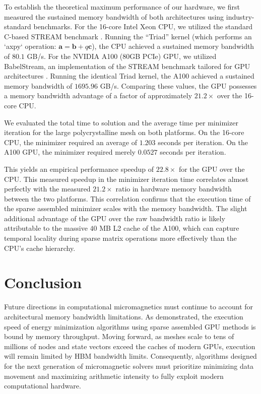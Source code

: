 \documentclass[10pt, a4paper, twocolumn]{article}
\begin{document}
To establish the theoretical maximum performance of our hardware, we first measured the sustained memory bandwidth of both architectures using industry-standard benchmarks. For the 16-core Intel Xeon CPU, we utilized the standard C-based STREAM benchmark \cite{McCalpin1995}. Running the ``Triad'' kernel (which performs an `axpy` operation: $\mathbf{a} = \mathbf{b} + q \mathbf{c}$), the CPU achieved a sustained memory bandwidth of $80.1$ GB/s. For the NVIDIA A100 (80GB PCIe) GPU, we utilized BabelStream, an implementation of the STREAM benchmark tailored for GPU architectures \cite{Deakin2018}. Running the identical Triad kernel, the A100 achieved a sustained memory bandwidth of $1695.96$ GB/s. Comparing these values, the GPU possesses a memory bandwidth advantage of a factor of approximately $21.2\times$ over the 16-core CPU.

We evaluated the total time to solution and the average time per minimizer iteration for the large polycrystalline mesh on both platforms. On the 16-core CPU, the minimizer required an average of $1.203$ seconds per iteration. On the A100 GPU, the minimizer required merely $0.0527$ seconds per iteration. 

This yields an empirical performance speedup of $22.8\times$ for the GPU over the CPU. This measured speedup in the minimizer iteration time correlates almost perfectly with the measured $21.2\times$ ratio in hardware memory bandwidth between the two platforms. This correlation confirms that the execution time of the sparse assembled minimizer scales with the memory bandwidth. The slight additional advantage of the GPU over the raw bandwidth ratio is likely attributable to the massive $40$ MB L2 cache of the A100, which can capture temporal locality during sparse matrix operations more effectively than the CPU's cache hierarchy.

\section{Conclusion}

Future directions in computational micromagnetics must continue to account for architectural memory bandwidth limitations. As demonstrated, the execution speed of energy minimization algorithms using sparse assembled GPU methods is bound by memory throughput. Moving forward, as meshes scale to tens of millions of nodes and state vectors exceed the caches of modern GPUs, execution will remain limited by HBM bandwidth limits. Consequently, algorithms designed for the next generation of micromagnetic solvers must prioritize minimizing data movement and maximizing arithmetic intensity to fully exploit modern computational hardware.



\end{document}
